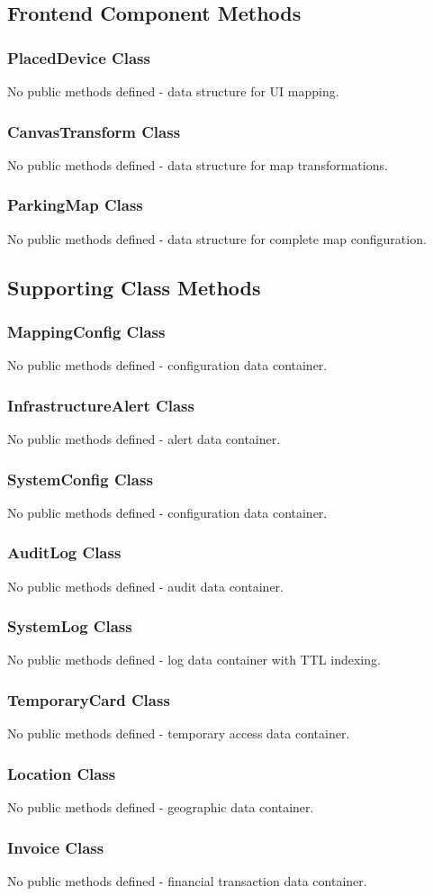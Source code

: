 \subsection{Frontend Component Methods}

\subsubsection{PlacedDevice Class}
No public methods defined - data structure for UI mapping.

\subsubsection{CanvasTransform Class}
No public methods defined - data structure for map transformations.

\subsubsection{ParkingMap Class}
No public methods defined - data structure for complete map configuration.

\subsection{Supporting Class Methods}

\subsubsection{MappingConfig Class}
No public methods defined - configuration data container.

\subsubsection{InfrastructureAlert Class}
No public methods defined - alert data container.

\subsubsection{SystemConfig Class}
No public methods defined - configuration data container.

\subsubsection{AuditLog Class}
No public methods defined - audit data container.

\subsubsection{SystemLog Class}
No public methods defined - log data container with TTL indexing.

\subsubsection{TemporaryCard Class}
No public methods defined - temporary access data container.

\subsubsection{Location Class}
No public methods defined - geographic data container.

\subsubsection{Invoice Class}
No public methods defined - financial transaction data container.
